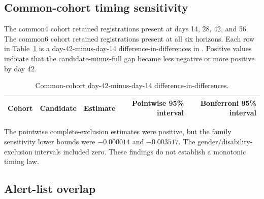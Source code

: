 \subsection{Common-cohort timing sensitivity}

The common4 cohort retained registrations present at days 14, 28, 42, and 56. The common6 cohort retained registrations present at all six horizons. Each row in Table~\ref{tab:s_common} is a day-42-minus-day-14 difference-in-differences in \Pten{}. Positive values indicate that the candidate-minus-full gap became less negative or more positive by day 42.

\begin{table}[htbp]
\centering
\caption{Common-cohort day-42-minus-day-14 difference-in-differences.}
\label{tab:s_common}
\small
\begin{tabular}{llrrr}
\toprule
Cohort & Candidate & Estimate & Pointwise 95\% interval & Bonferroni 95\% interval \\
\midrule

\end{tabular}
\end{table}
\FloatBarrier

The pointwise complete-exclusion estimates were positive, but the family sensitivity lower bounds were $-0.000014$ and $-0.003517$. The gender/disability-exclusion intervals included zero. These findings do not establish a monotonic timing law.

\subsection{Alert-list overlap}

